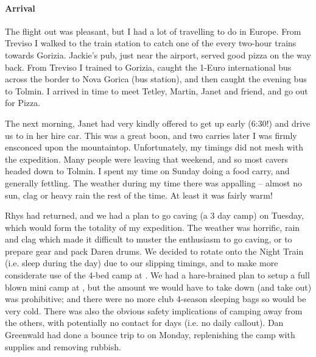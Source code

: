 \paragraph{Arrival}

The flight out was pleasant, but I had a lot of travelling to do in Europe. From Treviso I walked to the train station to catch one of the every two-hour trains towards Gorizia. Jackie's pub, just near the airport, served good pizza on the way back. From Treviso I trained to Gorizia, caught the 1-Euro international bus across the border to Nova Gorica (bus station), and then caught the evening bus to Tolmin. I arrived in time to meet Tetley, Martin, Janet and friend, and go out for Pizza.

The next morning, Janet had very kindly offered to get up early (6:30!) and drive us to  in her hire car. This was a great boon, and two carries later I was firmly ensconced upon the mountaintop. Unfortunately, my timings did not mesh with the expedition. Many people were leaving that weekend, and so most cavers headed down to Tolmin. I spent my time on Sunday doing a food carry, and generally fettling. The weather during my time there was appalling -- almost no sun, clag or heavy rain the rest of the time. At least it was fairly warm!

Rhys had returned, and we had a plan to go caving (a 3 day camp) on Tuesday, which would form the totality of my expedition. The weather was horrific, rain and clag which made it difficult to muster the enthusiasm to go caving, or to prepare gear and pack Daren drums. We decided to rotate onto the Night Train (i.e. sleep during the day) due to our slipping timings, and to make more considerate use of the 4-bed camp at . We had a hare-brained plan to setup a full blown mini camp at , but the amount we would have to take down (and take out) was prohibitive; and there were no more club 4-season sleeping bags so would be very cold. There was also the obvious safety implications of camping away from the others, with potentially no contact for days (i.e. no daily callout). Dan Greenwald had done a bounce trip to  on Monday, replenishing the camp with supplies and removing rubbish.

